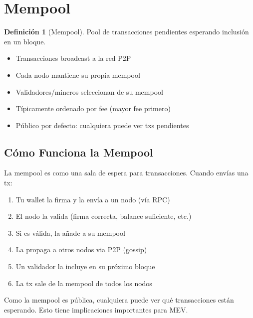 \documentclass[11pt,a4paper,twoside,openright]{book}
\theoremstyle{definition}
\newtheorem{definition}{Definición}[chapter]
\theoremstyle{plain}
\theoremstyle{remark}
\begin{document}
\section{Mempool}

\begin{definition}[Mempool]
Pool de transacciones pendientes esperando inclusión en un bloque.
\end{definition}

\begin{itemize}
    \item Transacciones broadcast a la red P2P
    \item Cada nodo mantiene su propia mempool
    \item Validadores/mineros seleccionan de su mempool
    \item Típicamente ordenado por fee (mayor fee primero)
    \item Público por defecto: cualquiera puede ver txs pendientes
\end{itemize}

\subsection{Cómo Funciona la Mempool}

\begin{intuicion}
La mempool es como una sala de espera para transacciones. Cuando envías una tx:
\begin{enumerate}
    \item Tu wallet la firma y la envía a un nodo (vía RPC)
    \item El nodo la valida (firma correcta, balance suficiente, etc.)
    \item Si es válida, la añade a su mempool
    \item La propaga a otros nodos via P2P (gossip)
    \item Un validador la incluye en su próximo bloque
    \item La tx sale de la mempool de todos los nodos
\end{enumerate}

Como la mempool es pública, cualquiera puede ver qué transacciones están esperando. Esto tiene implicaciones importantes para MEV.
\end{intuicion}
\end{document}
